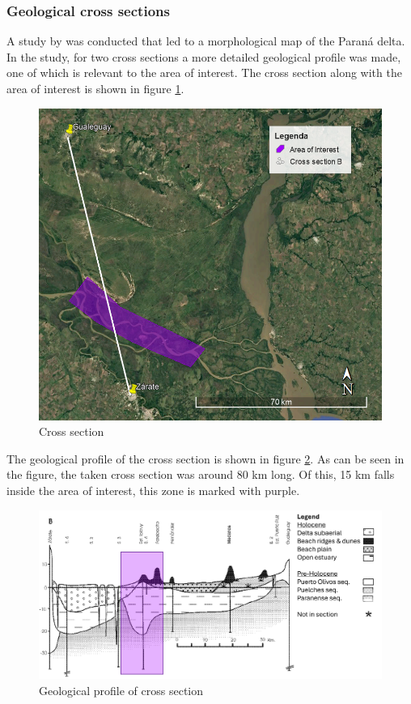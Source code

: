\subsubsection{Geological cross sections}
A study by \citeauthor{joseluiscavallottoEvolucionCambiosAmbientales2005} was conducted that led to a morphological map of the Paraná delta. In the study, for two cross sections a more detailed geological profile was made, one of which is relevant to the area of interest. The cross section along with the area of interest is shown in figure \ref{fig:crosssectiongeo}.

\begin{figure}[H]
    \centering
    \includegraphics[width=0.75\linewidth]{figures/ch9/CrossSectionB.png}
    \caption{Cross section}
    \label{fig:crosssectiongeo}
\end{figure}

The geological profile of the cross section is shown in figure \ref{fig:geolprofile}. As can be seen in the figure, the taken cross section was around 80 km long. Of this, 15 km falls inside the area of interest, this zone is marked with purple.

\begin{figure}[H]
    \centering
    \includegraphics[width=1\linewidth]{figures/ch9/CrossSectionBResults.png}
    \caption{Geological profile of cross section \autocite{joseluiscavallottoEvolucionCambiosAmbientales2005}}
    \label{fig:geolprofile}
\end{figure}


